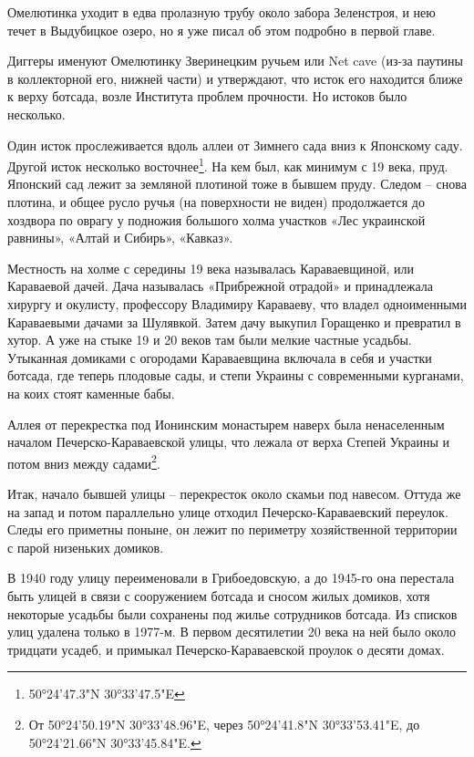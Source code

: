 Омелютинка уходит в едва пролазную трубу около забора Зеленстроя, и нею течет в Выдубицкое озеро, но я уже писал об этом подробно в первой главе.

Диггеры именуют Омелютинку Зверинецким ручьем или Net cave (из-за паутины в коллекторной его, нижней части) и утверждают, что исток его находится ближе к верху ботсада, возле Института проблем прочности. Но истоков было несколько.

Один исток прослеживается вдоль аллеи от Зимнего сада вниз к Японскому саду. Другой исток несколько восточнее\footnote{50°24'47.3"N 30°33'47.5"E}. На кем был, как минимум с 19 века, пруд. Японский сад лежит за земляной плотиной тоже в бывшем пруду. Следом – снова плотина, и общее русло ручья (на поверхности не виден) продолжается до хоздвора по оврагу у подножия большого холма участков «Лес украинской равнины», «Алтай и Сибирь», «Кавказ».


Местность на холме с середины 19 века называлась Караваевщиной, или Караваевой дачей. Дача называлась «Прибрежной отрадой» и принадлежала хирургу и окулисту, профессору Владимиру Караваеву, что владел одноименными Караваевыми дачами за Шулявкой. Затем дачу выкупил Горащенко и превратил в хутор. А уже на стыке 19 и 20 веков там были  мелкие частные усадьбы. Утыканная домиками с огородами Караваевщина включала в себя и участки ботсада, где теперь плодовые сады, и степи Украины с современными  курганами, на коих стоят каменные бабы.


Аллея от перекрестка под Ионинским монастырем наверх была ненаселенным началом Печерско-Караваевской улицы, что лежала от верха Степей Украины и потом вниз между садами\footnote{От 50°24'50.19"N 30°33'48.96"E, через 50°24'41.8"N 30°33'53.41"E, до 50°24'21.66"N 30°33'45.84"E.}. 

Итак, начало бывшей улицы – перекресток около скамьи под навесом. Оттуда же на запад и потом параллельно улице отходил Печерско-Караваевский переулок. Следы его приметны поныне, он лежит по периметру хозяйственной территории с парой низеньких домиков.

В 1940 году улицу переименовали в Грибоедовскую, а до 1945-го она перестала быть улицей в связи с сооружением ботсада и сносом жилых домиков, хотя некоторые усадьбы были сохранены под жилье сотрудников ботсада. Из списков улиц удалена только в 1977-м. В первом десятилетии 20 века на ней было около тридцати усадеб, и примыкал Печерско-Караваевской проулок о десяти домах.

